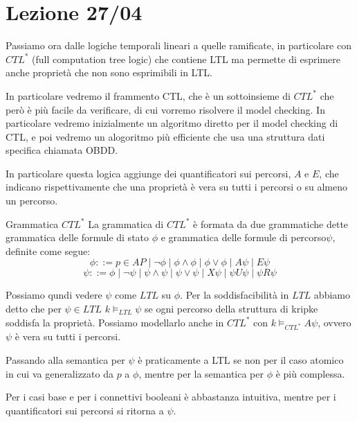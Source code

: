 \chapter{Lezione 27/04}

Passiamo ora dalle logiche temporali lineari a quelle ramificate, in particolare con \(CTL^*\) (full computation tree logic) che contiene LTL ma permette di esprimere anche proprietà che non sono esprimibili in LTL\@.

In particolare vedremo il frammento CTL, che è un sottoinsieme di \(CTL^*\) che però è più facile da verificare, di cui vorremo risolvere il model checking. In particolare vedremo inizialmente un algoritmo diretto per il model checking di CTL, e poi vedremo un alogoritmo più efficiente che usa una struttura dati specifica chiamata OBDD\@.

In particolare questa logica aggiunge dei quantificatori sui percorsi, \(A\) e \(E\), che indicano rispettivamente che una proprietà è vera su tutti i percorsi o su almeno un percorso.

\begin{definition}{Grammatica \(CTL^*\)}
  La grammatica di \(CTL^*\) è formata da due grammatiche dette grammatica delle formule di stato \(\phi\) e grammatica delle formule di percorso\(\psi\), definite come segue:
  \[\phi ::= p \in AP \mid \neg \phi \mid \phi \land \phi \mid \phi \lor \phi \mid A\psi \mid E\psi\]
  \[\psi ::= \phi \mid \neg \psi \mid \psi \land \psi \mid \psi \lor \psi \mid X\psi \mid \psi U\psi \mid \psi R\psi\]

\end{definition}
Possiamo qundi vedere \(\psi\) come \(LTL\) su \(\phi\). Per la soddisfacibilità in \(LTL\) abbiamo detto che per \(\psi \in LTL\) \(k \models_{LTL} \psi\) se ogni percorso della struttura di kripke soddisfa la proprietà. Possiamo modellarlo anche in \(CTL^*\) con \(k \models_{CTL^*} A\psi\), ovvero \(\psi\) è vera su tutti i percorsi.

Passando alla semantica per \(\psi\) è praticamente a LTL se non per il caso atomico in cui va generalizzato da \(p\) a \(\phi\), mentre per la semantica per \(\phi\) è più complessa.

Per i casi base e per i connettivi booleani è abbastanza intuitiva, mentre per i quantificatori sui percorsi si ritorna a \(\psi\).

